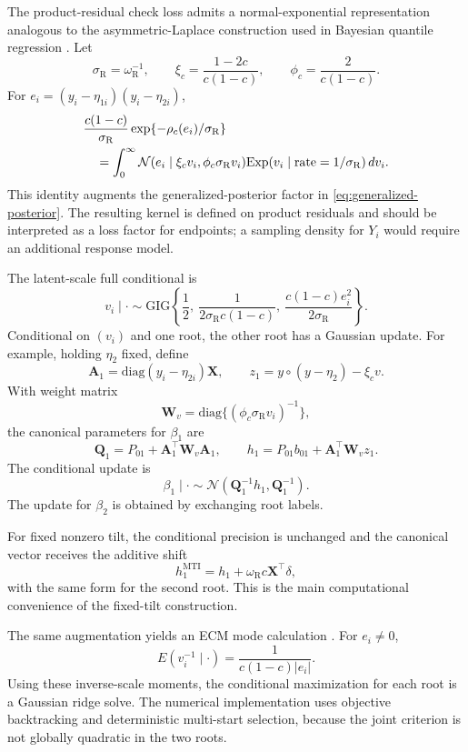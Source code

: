 \documentclass[11pt]{article}
\numberwithin{equation}{section}
\newcommand{\Normal}{\mathcal{N}}
\newcommand{\Exp}{\mathrm{Exp}}
\newcommand{\GIG}{\mathrm{GIG}}
\newcommand{\diag}{\mathrm{diag}}
\newcommand{\mat}[1]{\bm{#1}}
\begin{document}
The product-residual check loss admits a normal-exponential representation
analogous to the asymmetric-Laplace construction used in Bayesian quantile
regression \citep{yu2001bayesian,KozumiKobayashi2011Gibbs}. Let
\[
\sigma_{\mathrm R}=\omega_{\mathrm R}^{-1},\qquad
\xi_c=\frac{1-2c}{c(1-c)},\qquad
\phi_c=\frac{2}{c(1-c)}.
\]
For \(e_i=(y_i-\eta_{1i})(y_i-\eta_{2i})\),
\begin{align}
&\frac{c(1-c)}{\sigma_{\mathrm R}}
\exp\{-\rho_c(e_i)/\sigma_{\mathrm R}\}\notag\\
&\quad=
\int_0^\infty
\Normal(e_i\mid \xi_cv_i,\phi_c\sigma_{\mathrm R}v_i)
\Exp(v_i\mid\mathrm{rate}=1/\sigma_{\mathrm R})\,dv_i .
\label{eq:pseudo-al}
\end{align}
This identity augments the generalized-posterior factor in
\eqref{eq:generalized-posterior}. The resulting kernel is defined on product
residuals and should be interpreted as a loss factor for endpoints; a sampling
density for \(Y_i\) would require an additional response model.

The latent-scale full conditional is
\[
v_i\mid\cdot\sim
\GIG\left\{
\frac12,\
\frac{1}{2\sigma_{\mathrm R}c(1-c)},\
\frac{c(1-c)e_i^2}{2\sigma_{\mathrm R}}
\right\}.
\]
Conditional on \((v_i)\) and one root, the other root has a Gaussian update.
For example, holding \(\eta_2\) fixed, define
\[
\mat A_1=\diag(y_i-\eta_{2i})\mat X,\qquad
z_1=y\circ(y-\eta_2)-\xi_c v.
\]
With weight matrix
\[
\mat W_v=\diag\{(\phi_c\sigma_{\mathrm R}v_i)^{-1}\},
\]
the canonical parameters for \(\beta_1\) are
\[
\mat Q_1=P_{01}+\mat A_1^\top\mat W_v\mat A_1,
\qquad
h_1=P_{01}b_{01}+\mat A_1^\top\mat W_v z_1.
\]
The conditional update is
\[
\beta_1\mid\cdot\sim \Normal(\mat Q_1^{-1}h_1,\mat Q_1^{-1}).
\]
The update for \(\beta_2\) is obtained by exchanging root labels.

For fixed nonzero tilt, the conditional precision is unchanged and the
canonical vector receives the additive shift
\[
h_1^{\mathrm{MTI}}
=h_1+\omega_{\mathrm R}c\mat X^\top\delta ,
\]
with the same form for the second root. This is the main computational
convenience of the fixed-tilt construction.

The same augmentation yields an ECM mode calculation
\citep{DempsterLairdRubin1977EM,MengRubin1993ECM}. For \(e_i\ne0\),
\[
E(v_i^{-1}\mid\cdot)=\frac{1}{c(1-c)|e_i|}.
\]
Using these inverse-scale moments, the conditional maximization for each root
is a Gaussian ridge solve. The numerical implementation uses objective
backtracking and deterministic multi-start selection, because the joint
criterion is not globally quadratic in the two roots.
\end{document}

